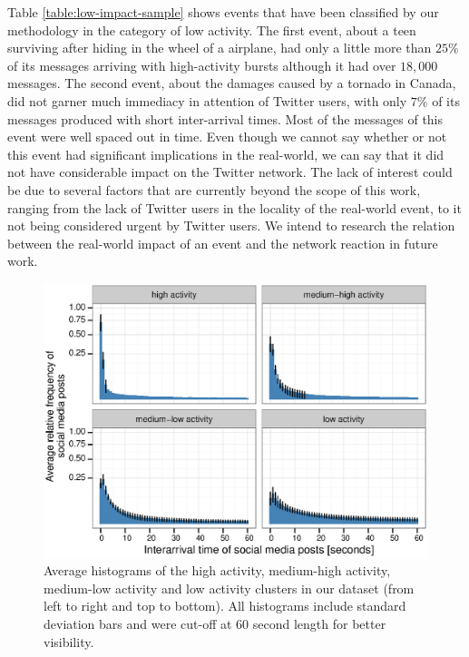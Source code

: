 Table \ref{table:low-impact-sample} shows events that have been classified by
our methodology in the category of low activity. 
%
The first event, about a teen surviving after hiding in the wheel of a airplane,
had only a little more than $25\%$ of its messages arriving with high-activity
bursts although it had over $18,000$ messages.  
%
The second event, about the damages caused by a tornado in Canada, did not
garner much immediacy in attention of Twitter users, with only $7\%$ of its
messages produced with short inter-arrival times. 
%
Most of the messages of this event were well spaced out in time. 
%
Even though we cannot say whether or not this event had significant implications
in the real-world, we can say that it did not have considerable impact on the
Twitter network. 
%
The lack of interest could be due to several factors that are currently beyond
the scope of this work, ranging from the lack of Twitter users in the locality
of the real-world event, to it not being considered urgent by Twitter users. 
%
We intend to research the relation between the real-world impact of an event and
the network reaction in future work.


\begin{figure}[!htb]
  \centering
   \includegraphics[width=\textwidth]{figures/high-activity/fig4}
  \caption[Average histograms of activity levels]{Average histograms of the high
      activity, medium-high activity, medium-low activity and low activity
      clusters in our dataset (from left to right and top to bottom). All
      histograms include standard deviation bars and were cut-off at 60 second
      length for better visibility.
    }\label{fig:hi:avg-hist}
\end{figure}

